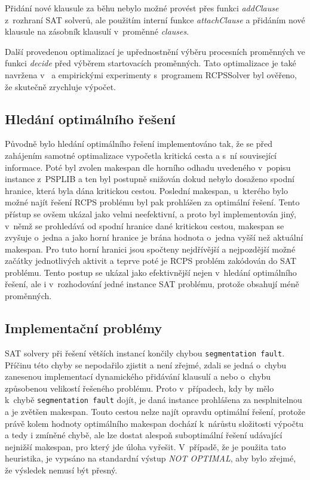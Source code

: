 \documentclass[a4paper, 12pt]{article}
\begin{document}
Přidání nové klausule za běhu nebylo možné provést přes funkci \emph{addClause} z~rozhraní SAT solverů, ale použitím
interní funkce \emph{attachClause} a přidáním nové klausule na zásobník klausulí v~proměnné \emph{clauses}.

Další provedenou optimalizací je upřednostnění výběru procesních proměnných ve funkci \emph{decide} před výběrem
startovacích proměnných.
Tato optimalizace je také navržena v~\cite{horbach:10} a empirickými experimenty s~programem RCPSSolver
byl ověřeno, že skutečně zrychluje výpočet.

\subsection{Hledání optimálního řešení}
Původně bylo hledání optimálního řešení implementováno tak, že se před
zahájením samotné optimalizace vypočetla kritická cesta a s~ní související informace.
Poté byl zvolen makespan dle horního odhadu uvedeného v~popisu instance z~PSPLIB
a ten byl postupně snižován dokud nebylo dosaženo spodní hranice, která
byla dána kritickou cestou.
Poslední makespan, u~kterého bylo možné najít řešení RCPS problému byl pak prohlášen
za optimální řešení.
Tento přístup se ovšem ukázal jako velmi neefektivní, a proto byl
implementován jiný, v~němž se prohledává od spodní hranice dané kritickou cestou,
makespan se zvyšuje o~jedna a jako horní hranice je brána hodnota o~jedna
vyšší než aktuální makespan.
Pro tuto horní hranici jsou spočteny nejdřívější a nejpozdější možné začátky
jednotlivých aktivit a teprve poté je RCPS problém zakódován do SAT problému.
Tento postup se ukázal jako efektivnější nejen v~hledání optimálního řešení, ale i
v~rozhodování jedné instance SAT problému, protože obsahují méně proměnných. 

\subsection{Implementační problémy}
\label{sub:impl}
SAT solvery při řešení větších instancí končily chybou \texttt{segmentation fault}.
Příčinu této chyby se nepodařilo zjistit a není zřejmé, zdali se jedná
o~chybu zanesenou implementací dynamického přidávání klausulí a nebo o~chybu
způsobenou velikostí řešeného problému.
Proto v~případech, kdy by mělo k~chybě \texttt{segmentation fault} dojít,
je daná instance prohlášena za nesplnitelnou a je zvětšen makespan.
Touto cestou nelze najít opravdu optimální řešení, protože právě kolem
hodnoty optimálního makespan dochází k~nárůstu složitosti výpočtu a tedy
i zmíněné chybě, ale lze dostat alespoň suboptimální řešení udávající
nejnižší makespan, pro který jde úloha vyřešit.
V~případě, že je použita tato heuristika, je vypsáno na standardní výstup
\emph{NOT OPTIMAL}, aby bylo zřejmé, že výsledek nemusí být přesný.
\end{document}
